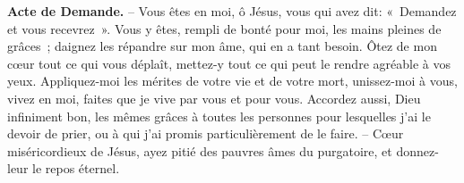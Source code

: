 \textbf{Acte de Demande.} – Vous êtes en moi, ô Jésus, vous qui avez dit: «~Demandez et vous recevrez~». Vous y êtes, rempli de bonté pour moi, les mains pleines de grâces~; daignez les répandre sur mon âme, qui en a tant besoin. Ôtez de mon cœur tout ce qui vous déplaît, mettez-y tout ce qui peut le rendre agréable à vos yeux. Appliquez-moi les mérites de votre vie et de votre mort, unissez-moi à vous, vivez en moi, faites que je vive par vous et pour vous. Accordez aussi, Dieu infiniment bon, les mêmes grâces à toutes les personnes pour lesquelles j’ai le devoir de prier, ou à qui j’ai promis particulièrement de le faire. – Cœur miséricordieux de Jésus, ayez pitié des pauvres âmes du purgatoire, et donnez-leur le repos éternel.





